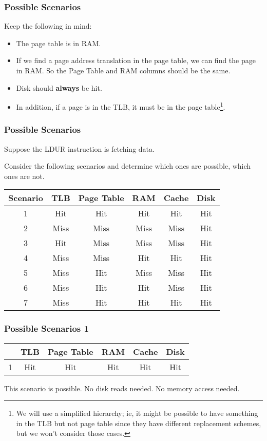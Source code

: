 \begin{frame}\frametitle{Possible Scenarios}
Keep the following in mind:
\begin{itemize}
\item The page table is in RAM.

\item If we find a page address translation in the page table, we can find the page in RAM. So the Page Table and RAM columns should be the same.
\item Disk should \textbf{always} be hit. 
\item In addition, if a page is in the TLB, it must be in the page table\footnote{We will use a simplified hierarchy; ie, it might be possible
			to have something in the TLB but not page table since they
			have different replacement schemes, but we won't consider
			those cases.}.
\end{itemize}
\end{frame}
\begin{frame}\frametitle{Possible Scenarios}

Suppose the LDUR instruction is fetching data.

Consider the following scenarios and determine which ones are possible, which ones are not.

\begin{center}
	\begin{tabular}{c|c|c|c|c|c|}
Scenario  & TLB & Page Table & RAM & Cache & Disk \\ \hline
1 & Hit  & Hit  & Hit  & Hit  & Hit \\ %
2 & Miss & Miss & Miss & Miss & Hit \\%
3 & Hit  & Miss & Miss & Miss & Hit \\ %
4 & Miss & Miss & Hit  & Hit  & Hit \\
5 & Miss & Hit  & Miss & Miss & Hit\\
6 & Miss & Hit  & Hit  & Miss & Hit \\
7 & Miss & Hit  & Hit  & Hit  & Hit\\
\end{tabular}
\end{center}\end{frame}


\begin{frame}\frametitle{Possible Scenarios 1}

\begin{center}
	\begin{tabular}{c|c|c|c|c|c|}
  & TLB & Page Table & RAM & Cache & Disk \\ \hline
1 & Hit  & Hit  & Hit  & Hit  & Hit \\ %
\end{tabular}
\end{center}
This scenario is possible. No disk reads needed. No memory access needed.
\end{frame}


